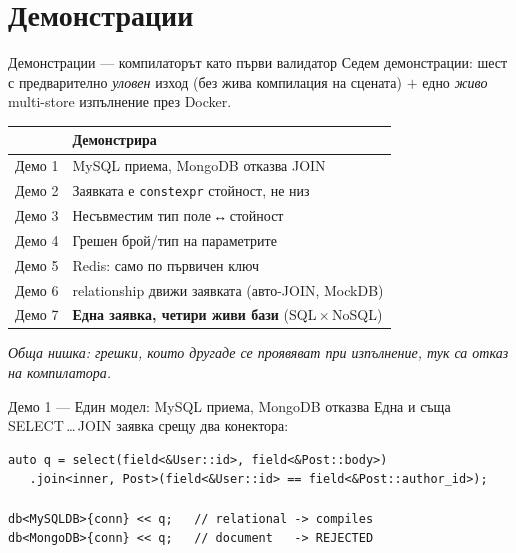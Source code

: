 \documentclass[aspectratio=169,12pt]{beamer}
\begin{document}
\section{Демонстрации}

\begin{frame}{Демонстрации — компилаторът като първи валидатор}
    {\footnotesize Седем демонстрации: шест с предварително \emph{уловен} изход (без жива
    компилация на сцената) $+$ едно \emph{живо} multi-store изпълнение през Docker.}
    \vspace{0.3em}
    \footnotesize
    \renewcommand{\arraystretch}{1.3}
    \begin{tabularx}{\linewidth}{@{}p{1.3cm}X@{}}
        \toprule
        & \textbf{Демонстрира}\\
        \midrule
        Демо 1 & MySQL приема, MongoDB отказва JOIN\\
        Демо 2 & Заявката е \texttt{constexpr} стойност, не низ\\
        Демо 3 & Несъвместим тип поле\,↔\,стойност\\
        Демо 4 & Грешен брой/тип на параметрите\\
        Демо 5 & Redis: само по първичен ключ\\
        Демо 6 & relationship движи заявката (авто-JOIN, MockDB)\\
        Демо 7 & \textbf{Една заявка, четири живи бази} (SQL\,$\times$\,NoSQL)\\
        \bottomrule
    \end{tabularx}
    \vspace{0.3em}

    {\footnotesize\itshape Обща нишка: грешки, които другаде се проявяват при изпълнение,
    тук са отказ на компилатора.}
\end{frame}

\begin{frame}[fragile]{Демо 1 — Един модел: MySQL приема, MongoDB отказва}
    {\footnotesize Една и съща SELECT\,…\,JOIN заявка срещу два конектора:}
\begin{lstlisting}[basicstyle=\footnotesize\ttfamily]
auto q = select(field<&User::id>, field<&Post::body>)
   .join<inner, Post>(field<&User::id> == field<&Post::author_id>);

db<MySQLDB>{conn} << q;   // relational -> compiles
db<MongoDB>{conn} << q;   // document   -> REJECTED
\end{lstlisting}
    
\end{frame}
\end{document}
